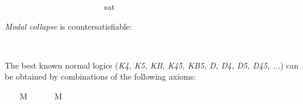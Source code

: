 \begin{isabellebody}
\begin{isamarkuptext}
\end{isamarkuptext}\isamarkuptrue%
\ \isamarkupfalse%
\ {\isachardoublequoteopen}{\isasymlfloor}\isactrlbold {\isasymdiamond}{\isasymphi}{\isasymrfloor}\ \ {\isasymlongrightarrow}\ {\isasymlfloor}\isactrlbold {\isasymbox}{\isasymphi}{\isasymrfloor}{\isachardoublequoteclose}\ \isamarkupfalse%
%
\isadelimproof
\ %
\endisadelimproof
%
\isatagproof
{}\isamarkupfalse%
\ \ \ \ \ \ \ \ \ \ \ \ %
%
\endisatagproof
{\isafoldproof}%
%
\isadelimproof
%
\endisadelimproof
\isanewline
\ \isamarkupfalse%
\ {\isachardoublequoteopen}{\isasymlfloor}\isactrlbold {\isasymbox}{\isasymphi}{\isasymrfloor}\isactrlsup s\isactrlsup a\isactrlsup t\ {\isasymlongrightarrow}\ {\isasymlfloor}\isactrlbold {\isasymbox}{\isasymphi}{\isasymrfloor}{\isachardoublequoteclose}\ \isamarkupfalse%
%
\isadelimproof
\ %
\endisadelimproof
%
\isatagproof
{}\isamarkupfalse%
\ \ \ \ \ \ \ \ \ \ \ %
%
\endisatagproof
{\isafoldproof}%
%
\isadelimproof
%
\endisadelimproof
%
\begin{isamarkuptext}%
\emph{Modal collapse} is countersatisfiable:%
\end{isamarkuptext}\isamarkuptrue%
\ \isamarkupfalse%
\ {\isachardoublequoteopen}{\isasymlfloor}{\isasymphi}\ \isactrlbold {\isasymrightarrow}\ \isactrlbold {\isasymbox}{\isasymphi}{\isasymrfloor}{\isachardoublequoteclose}\ \isamarkupfalse%
%
\isadelimproof
\ %
\endisadelimproof
%
\isatagproof
{}\isamarkupfalse%
\ \ \ \ \ \ \ \ \ \ \ \ \ \ \ \ \ \ %
%
\endisatagproof
{\isafoldproof}%
%
\isadelimproof
%
\endisadelimproof
%
\begin{isamarkuptext}%
\pagebreak%
\end{isamarkuptext}\isamarkuptrue%
%
\isamarkuptrue%
%
\begin{isamarkuptext}%
The best known normal logics (\emph{K4, K5, KB, K45, KB5, D, D4, D5, D45, ...}) can be obtained by
 combinations of the following axioms:%
\end{isamarkuptext}\isamarkuptrue%
\ \ \isamarkupfalse%
\ M\ \isanewline
\ \ \ \ \ {\isachardoublequoteopen}M\ {\isasymequiv}\ \isactrlbold {\isasymforall}{\isasymphi}{\isachardot}\ \isactrlbold {\isasymbox}{\isasymphi}\ \isactrlbold {\isasymrightarrow}\ {\isasymphi}{\isachardoublequoteclose}\isanewline

\end{isabellebody}

